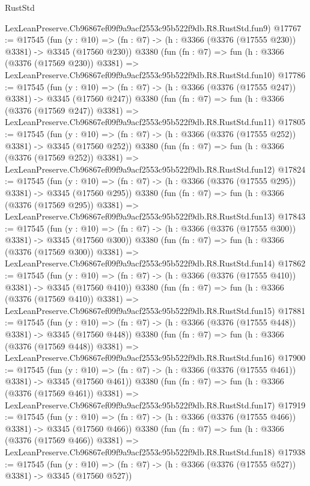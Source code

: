 \begin{lexlean}{RustStd}
\begin{coremodule}
    LexLeanPreserve.Cb96867ef09f9a9acf2553c95b522f9db.R8.RustStd.fun9)
@17767 := @17545
    (fun (y : @10) => (fn : @7) -> (h : @3366 (@3376 (@17555 @230)) @3381) -> @3345 (@17560 @230))
    @3380
    (fun (fn : @7) =>
    fun (h : @3366 (@3376 (@17569 @230)) @3381) =>
    LexLeanPreserve.Cb96867ef09f9a9acf2553c95b522f9db.R8.RustStd.fun10)
@17786 := @17545
    (fun (y : @10) => (fn : @7) -> (h : @3366 (@3376 (@17555 @247)) @3381) -> @3345 (@17560 @247))
    @3380
    (fun (fn : @7) =>
    fun (h : @3366 (@3376 (@17569 @247)) @3381) =>
    LexLeanPreserve.Cb96867ef09f9a9acf2553c95b522f9db.R8.RustStd.fun11)
@17805 := @17545
    (fun (y : @10) => (fn : @7) -> (h : @3366 (@3376 (@17555 @252)) @3381) -> @3345 (@17560 @252))
    @3380
    (fun (fn : @7) =>
    fun (h : @3366 (@3376 (@17569 @252)) @3381) =>
    LexLeanPreserve.Cb96867ef09f9a9acf2553c95b522f9db.R8.RustStd.fun12)
@17824 := @17545
    (fun (y : @10) => (fn : @7) -> (h : @3366 (@3376 (@17555 @295)) @3381) -> @3345 (@17560 @295))
    @3380
    (fun (fn : @7) =>
    fun (h : @3366 (@3376 (@17569 @295)) @3381) =>
    LexLeanPreserve.Cb96867ef09f9a9acf2553c95b522f9db.R8.RustStd.fun13)
@17843 := @17545
    (fun (y : @10) => (fn : @7) -> (h : @3366 (@3376 (@17555 @300)) @3381) -> @3345 (@17560 @300))
    @3380
    (fun (fn : @7) =>
    fun (h : @3366 (@3376 (@17569 @300)) @3381) =>
    LexLeanPreserve.Cb96867ef09f9a9acf2553c95b522f9db.R8.RustStd.fun14)
@17862 := @17545
    (fun (y : @10) => (fn : @7) -> (h : @3366 (@3376 (@17555 @410)) @3381) -> @3345 (@17560 @410))
    @3380
    (fun (fn : @7) =>
    fun (h : @3366 (@3376 (@17569 @410)) @3381) =>
    LexLeanPreserve.Cb96867ef09f9a9acf2553c95b522f9db.R8.RustStd.fun15)
@17881 := @17545
    (fun (y : @10) => (fn : @7) -> (h : @3366 (@3376 (@17555 @448)) @3381) -> @3345 (@17560 @448))
    @3380
    (fun (fn : @7) =>
    fun (h : @3366 (@3376 (@17569 @448)) @3381) =>
    LexLeanPreserve.Cb96867ef09f9a9acf2553c95b522f9db.R8.RustStd.fun16)
@17900 := @17545
    (fun (y : @10) => (fn : @7) -> (h : @3366 (@3376 (@17555 @461)) @3381) -> @3345 (@17560 @461))
    @3380
    (fun (fn : @7) =>
    fun (h : @3366 (@3376 (@17569 @461)) @3381) =>
    LexLeanPreserve.Cb96867ef09f9a9acf2553c95b522f9db.R8.RustStd.fun17)
@17919 := @17545
    (fun (y : @10) => (fn : @7) -> (h : @3366 (@3376 (@17555 @466)) @3381) -> @3345 (@17560 @466))
    @3380
    (fun (fn : @7) =>
    fun (h : @3366 (@3376 (@17569 @466)) @3381) =>
    LexLeanPreserve.Cb96867ef09f9a9acf2553c95b522f9db.R8.RustStd.fun18)
@17938 := @17545
    (fun (y : @10) => (fn : @7) -> (h : @3366 (@3376 (@17555 @527)) @3381) -> @3345 (@17560 @527))

\end{coremodule}
\end{lexlean}
